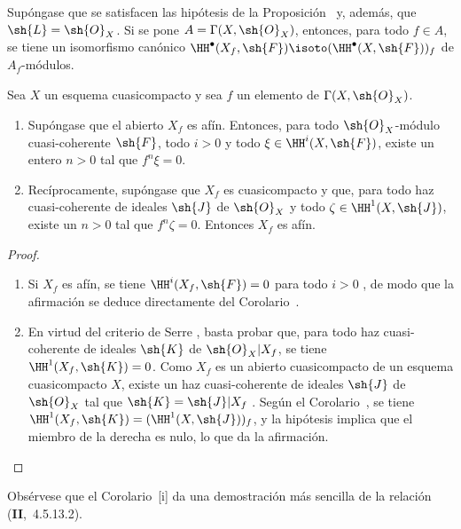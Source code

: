 \documentclass[oneside]{amsart}
\let\EGAOriginalLabel\label
\renewcommand{\label}[1]{\phantomsection\EGAOriginalLabel{#1}}
\begin{document}
\begin{corollary}[1.4.6]
\label{III.1.4.6}
Supóngase que se satisfacen las hipótesis de la Proposición~ y, además, que $\sh{L}=\sh{O}_X$.
Si se pone $A=\Gamma(X,\sh{O}_X)$, entonces, para todo $f\in A$, se tiene un isomorfismo canónico $\HH^\bullet(X_f,\sh{F})\isoto(\HH^\bullet(X,\sh{F}))_f$ de $A_f$-módulos.
\end{corollary}

\begin{corollary}[1.4.7]
\label{III.1.4.7}
Sea $X$ un esquema cuasicompacto y sea $f$ un elemento de $\Gamma(X,\sh{O}_X)$.
\begin{enumerate}
  \item[{\rm(i)}] Supóngase que el abierto $X_f$ es afín.
    Entonces, para todo $\sh{O}_X$-módulo cuasi-coherente $\sh{F}$, todo $i>0$ y todo $\xi\in\HH^i(X,\sh{F})$, existe un entero $n>0$ tal que $f^n\xi=0$.
  \item[{\rm(ii)}] Recíprocamente, supóngase que $X_f$ es cuasicompacto y que, para todo haz cuasi-coherente de ideales $\sh{J}$ de $\sh{O}_X$ y todo $\zeta\in\HH^1(X,\sh{J})$, existe un $n>0$ tal que $f^n\zeta=0$.
    Entonces $X_f$ es afín.
\end{enumerate}
\end{corollary}

\begin{proof}
\medskip\noindent
\begin{enumerate}
  \item[(i)] Si $X_f$ es afín, se tiene $\HH^i(X_f,\sh{F})=0$ para todo $i>0$ , de modo que la afirmación se deduce directamente del Corolario~.
  \item[(ii)] En virtud del criterio de Serre , basta probar que, para todo haz cuasi-coherente de ideales $\sh{K}$ de $\sh{O}_X|X_f$, se tiene $\HH^1(X_f,\sh{K})=0$.
    Como $X_f$ es un abierto cuasicompacto de un esquema cuasicompacto $X$, existe un haz cuasi-coherente de ideales $\sh{J}$ de $\sh{O}_X$ tal que $\sh{K}=\sh{J}|X_f$ .
    Según el Corolario~, se tiene $\HH^1(X_f,\sh{K})=(\HH^1(X,\sh{J}))_f$, y la hipótesis implica que el miembro de la derecha es nulo, lo que da la afirmación.
\end{enumerate}
\end{proof}

\begin{remark}[1.4.8]
\label{III.1.4.8}
Obsérvese que el Corolario~[i] da una demostración más sencilla de la relación (\textbf{II},~4.5.13.2).
\end{remark}
\end{document}
